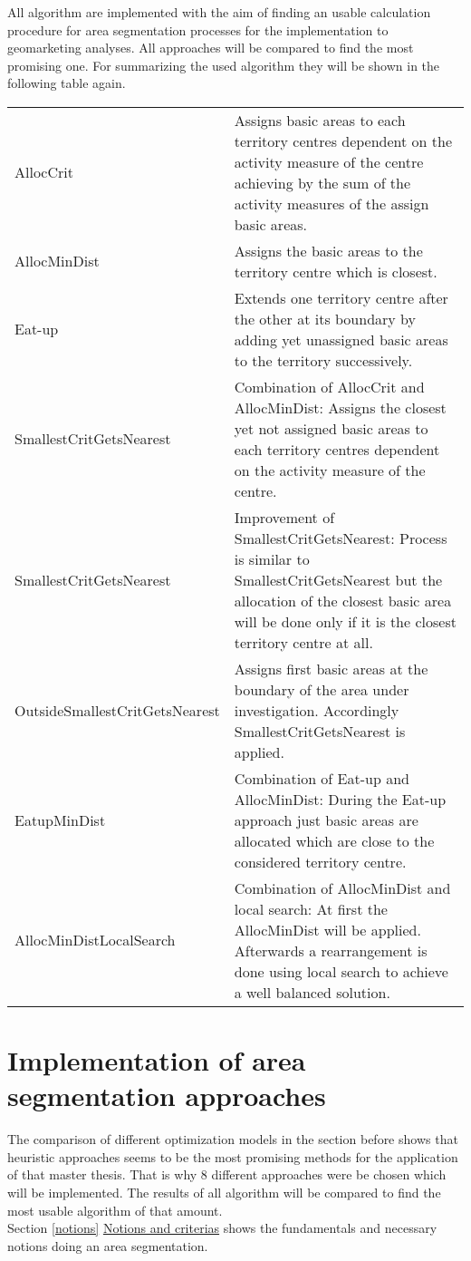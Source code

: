 All algorithm are implemented with the aim of finding an usable calculation procedure for area segmentation processes for the implementation to geomarketing analyses. All approaches will be compared to find the most promising one. For summarizing the used algorithm they will be shown in the following table again.

\newpage


\begin{table}[H]
	\begin{tabular}{|p{5.5cm}|>{\RaggedRight}p{7.5cm}|}
		\hline
		& \centering{short explanation} \tabularnewline
		\hline
		AllocCrit & Assigns basic areas to each territory centres dependent on the activity measure of the centre achieving by the sum of the activity measures of the assign basic areas.
		\tabularnewline
		\hline
		AllocMinDist & Assigns the basic areas to the territory centre which is closest.
		\tabularnewline
		\hline
		Eat-up & Extends one territory centre after the other at its boundary by adding yet unassigned basic areas to the territory successively.
		\tabularnewline
		\hline
		SmallestCritGetsNearest & Combination of AllocCrit and AllocMinDist: Assigns the closest yet not assigned basic areas to each territory centres dependent on the activity measure of the centre.
		\tabularnewline
		\hline
		SmallestCritGetsNearest & Improvement of SmallestCritGetsNearest: Process is similar to SmallestCritGetsNearest but the allocation of the closest basic area will be done only if it is the closest territory centre at all.
		\tabularnewline
		\hline
		OutsideSmallestCritGetsNearest & Assigns first basic areas at the boundary of the area under investigation. Accordingly SmallestCritGetsNearest is applied.
		\tabularnewline
		\hline
		EatupMinDist & Combination of Eat-up and AllocMinDist: During the Eat-up approach just basic areas are allocated which are close to the considered territory centre.
		\tabularnewline
		\hline
		AllocMinDistLocalSearch & Combination of AllocMinDist and local search: At first the AllocMinDist will be applied. Afterwards a rearrangement is done using local search to achieve a well balanced solution.
		\tabularnewline
		\hline
	\end{tabular}
\end{table}

\newpage

\section{Implementation of area segmentation approaches}\label{Implementation}
The comparison of different optimization models in the section before shows that heuristic approaches seems to be the most promising methods for the application of that master thesis. That is why 8 different approaches were be chosen which will be implemented. The results of all algorithm will be compared to find the most usable algorithm of that amount.  \\
Section \ref{notions} \hyperref[notions]{Notions and criterias} shows the fundamentals and necessary notions doing an area segmentation.


